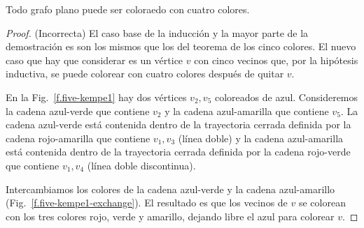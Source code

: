 \begin{theorem}\label{thm.fourcolor}
Todo grafo plano puede ser coloraedo con cuatro colores.
\end{theorem}

\begin{proof} (Incorrecta) El caso base de la inducción y la mayor parte de la demostración es son los mismos que los del teorema de los cinco colores. El nuevo caso que hay que considerar es un vértice $v$ con cinco vecinos que, por la hipótesis inductiva, se puede colorear con cuatro colores después de quitar $v$.

En la Fig.~\ref{f.five-kempe1} hay dos vértices $v_2,v_5$ coloreados de azul. Consideremos la cadena azul-verde que contiene $v_2$ y la cadena azul-amarilla que contiene $v_5$. La cadena azul-verde está contenida dentro de la trayectoria cerrada definida por la cadena rojo-amarilla que contiene $v_1,v_3$ (línea doble) y la cadena azul-amarilla está contenida dentro de la trayectoria cerrada definida por la cadena rojo-verde que contiene $v_1,v_4$ (línea doble discontinua).

Intercambiamos los colores de la cadena azul-verde y la cadena azul-amarillo (Fig.~\ref{f.five-kempe1-exchange}). El resultado es que los vecinos de $v$ se colorean con los tres colores rojo, verde y amarillo, dejando libre el azul para colorear $v$.
\end{proof}

